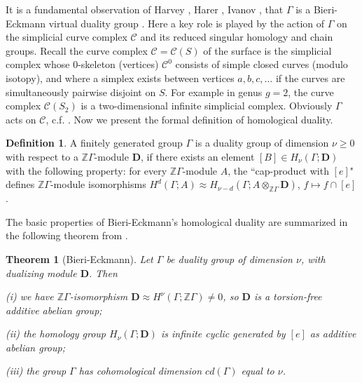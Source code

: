 \documentclass[12pt]{amsart}
\newtheorem*{thmm}{Theorem}
\theoremstyle{definition}
\newtheorem{dfn}[thm]{Definition}
\theoremstyle{remark}
\newcommand{\bZ}{\mathbb{Z}}
\newcommand{\bD}{\textbf{D}}
\newcommand{\sC}{\mathscr{C}}
\newcommand{\sT}{\mathscr{T}}
\begin{document}

It is a fundamental observation of Harvey \cite{Harvey}, Harer \cite{Harer1986}, Ivanov \cite{ivanov2015virtual}, that $\Gamma$ is a Bieri-Eckmann virtual duality group \cite{BiEck}. Here a key role is played by the action of $\Gamma$ on the simplicial curve complex $\sC$ and its reduced singular homology and chain groups. Recall the curve complex $\sC=\sC(S)$ of the surface is the simplicial complex whose $0$-skeleton (vertices) $\sC^0$ consists of simple closed curves (modulo isotopy), and where a simplex exists between vertices $a,b,c,\ldots$ if the curves are simultaneously pairwise disjoint on $S$. For example in genus $g=2$, the curve complex $\sC(S_2)$ is a two-dimensional infinite simplicial complex. Obviously $\Gamma$ acts on $\sC$, c.f. \cite{Broaddus2012}. Now we present the formal definition of homological duality.


\begin{dfn}
\label{hd}
A finitely generated group $\Gamma$ is a duality group of dimension $\nu \geq 0$ with respect to a $\bZ \Gamma$-module $\bD$, if there exists an element $[B]\in H_\nu(\Gamma; \bD)$ with the following property: for every $\bZ \Gamma$-module $A$, the ``cap-product with $[e]$" defines $\bZ \Gamma$-module isomorphisms $H^d(\Gamma;A) \approx H_{\nu-d}(\Gamma; A \otimes_{\bZ \Gamma} \bD)$, $f\mapsto f\cap [e]$. 
\end{dfn}

The basic properties of Bieri-Eckmann's homological duality are summarized in the following theorem from \cite{BiEck}.
\begin{thmm}[Bieri-Eckmann]\label{dual1}
Let $\Gamma$ be duality group of dimension $\nu$, with dualizing module $\bD$. Then 

(i) we have $\bZ \Gamma$-isomorphism $\bD \approx H^\nu(\Gamma;\bZ \Gamma) \neq 0$, so $\bD$ is a torsion-free additive abelian group;


(ii) the homology group $H_\nu (\Gamma; \bD)$ is infinite cyclic generated by $[e]$ as additive abelian group; 

(iii) the group $\Gamma$ has cohomological dimension $cd(\Gamma)$ equal to $\nu$.
\end{thmm}
\end{document}
